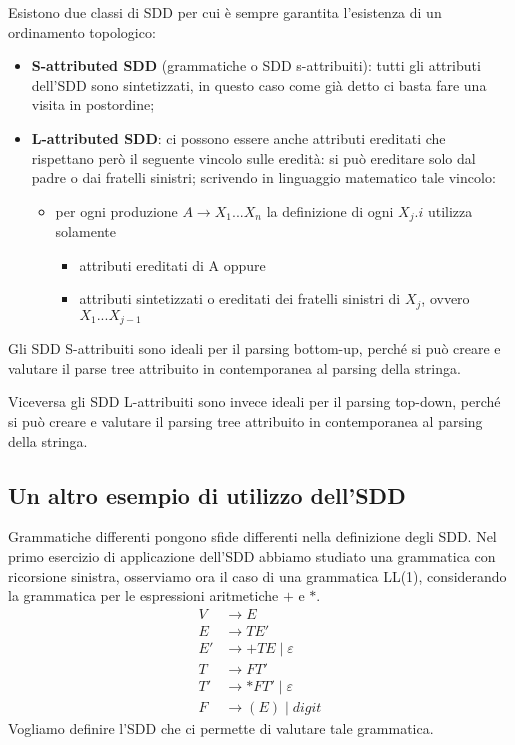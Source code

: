 \documentclass[class=book, crop=false, oneside, 12pt]{standalone}
\begin{document}
Esistono due classi di SDD per cui è sempre garantita l'esistenza di un ordinamento topologico:
\begin{itemize}
    \item \textbf{S-attributed SDD} (grammatiche o SDD s-attribuiti): tutti gli attributi dell'SDD sono sintetizzati, in questo caso come già detto ci basta fare una visita in postordine;
    \item \textbf{L-attributed SDD}: ci possono essere anche attributi ereditati che rispettano però il seguente vincolo sulle eredità: si può ereditare solo dal padre o dai fratelli sinistri; scrivendo in linguaggio matematico tale vincolo:
    \begin{itemize}
        \item per ogni produzione \(A \to X_1 ... X_n\) la definizione di ogni \(X_j.i\) utilizza solamente
        \begin{itemize}
            \item attributi ereditati di A oppure
            \item attributi sintetizzati o ereditati dei fratelli sinistri di \(X_j\), ovvero \(X_1 ... X_{j-1}\)
        \end{itemize}
    \end{itemize}
\end{itemize}
Gli SDD S-attribuiti sono ideali per il parsing bottom-up, perché si può creare e valutare il parse tree attribuito in contemporanea al parsing della stringa.

\noindent Viceversa gli SDD L-attribuiti sono invece ideali per il parsing top-down, perché si può creare e valutare il parsing tree attribuito in contemporanea al parsing della stringa.

\subsection{Un altro esempio di utilizzo dell'SDD}
Grammatiche differenti pongono sfide differenti nella definizione degli SDD.
Nel primo esercizio di applicazione dell'SDD abbiamo studiato una grammatica con ricorsione sinistra, osserviamo ora il caso di una grammatica LL(1), considerando la grammatica per le espressioni aritmetiche \(+\) e \(*\).
\begin{align*}
    V &\to E \\
    E &\to TE' \\
    E' &\to +TE \mid \varepsilon \\
    T &\to FT' \\
    T' &\to *FT' \mid \varepsilon \\
    F &\to (E) \mid digit
\end{align*}
Vogliamo definire l'SDD che ci permette di valutare tale grammatica.
\end{document}
